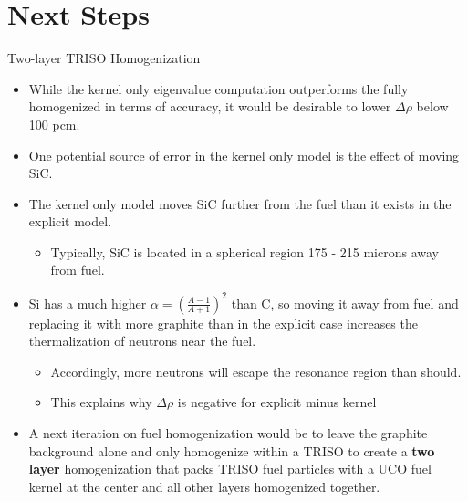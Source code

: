 \documentclass[9pt,t,aspectratio=169]{beamer}
\begin{document}
\section{Next Steps}
\begin{frame}{Two-layer TRISO Homogenization}
    \begin{itemize}
        \item While the kernel only eigenvalue computation outperforms the fully homogenized in terms of accuracy, it would be desirable to lower $\Delta \rho$ below 100 pcm.
        \item One potential source of error in the kernel only model is the effect of moving SiC.
        \item The kernel only model moves SiC further from the fuel than it exists in the explicit model.
        \begin{itemize}
            \item Typically, SiC is located in a spherical region 175 - 215 microns away from fuel.
        \end{itemize}
        \item Si has a much higher $\alpha = (\frac{A-1}{A+1})^2$ than C, so moving it away from fuel and replacing it with more graphite than in the explicit case increases the thermalization of neutrons near the fuel.
        \begin{itemize}
            \item Accordingly, more neutrons will escape the resonance region than should.
            \item This explains why $\Delta \rho$ is negative for explicit minus kernel
        \end{itemize}
        \item A next iteration on fuel homogenization would be to leave the graphite background alone and only homogenize within a TRISO to create a \textbf{two layer} homogenization that packs TRISO fuel particles with a UCO fuel kernel at the center and all other layers homogenized together. 
    \end{itemize}
\end{frame}

\end{document}
